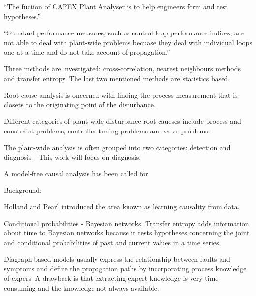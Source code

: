 \documentclass[a4paper]{book}
\begin{document}
``The fuction of CAPEX Plant Analyser is to help engineers form and test hypotheses.''~\cite{Yim2006}

``Standard performance measures, such as control loop performance indices, are not able to deal with plant-wide problems becuase they deal with individual loops one at a time and do not take account of propagation.''~\cite{Bauer2008}



Three methods are investigated: cross-correlation, nearest neighbours methods and transfer entropy.
The last two mentioned methods are statistics based.

Root cause analysis is oncerned with finding the process measurement that is closets to the originating point of the disturbance.

Different categories of plant wide disturbance root caueses include process and constraint problems, controller tuning problems and valve problems. %






The plant-wide analysis is often grouped into two categories: detection and diagnosis.~\cite{Bauer2008} %
This work will focus on diagnosis.

A model-free causal analysis has been called for~\cite{Bauer2008} %

Background:

Holland and Pearl introduced the area known as learning causality from data.

Conditional probabilities - Bayesian networks.
Transfer entropy adds information about time to Bayesian networks because it tests hypotheses concerning the joint and conditional probabilities of past and current values in a time series.






Diagraph based models usually express the relationship between faults and symptoms and define the propagation paths by incorporating process knowledge of expers.
A drawback is that extracting expert knowledge is very time consuming and the knowledge not always available.
\end{document}
